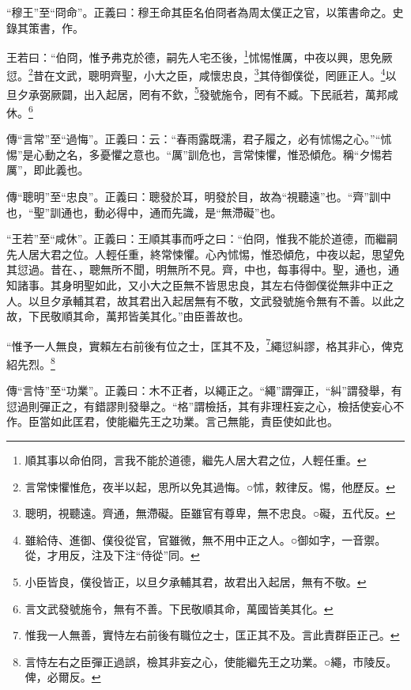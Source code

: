 {\noindent\shu{}\fzkt “穆王”至“冏命”。正義曰：穆王命其臣名伯冏者為周太僕正之官，以策書命之。史錄其策書，作。 \par}

王若曰：“伯冏，惟予弗克於德，嗣先人宅丕後，\footnote{順其事以命伯冏，言我不能於道德，繼先人居大君之位，人輕任重。}怵惕惟厲，中夜以興，思免厥愆。\footnote{言常悚懼惟危，夜半以起，思所以免其過悔。○怵，敕律反。惕，他歷反。}昔在文武，聰明齊聖，小大之臣，咸懷忠良，\footnote{聰明，視聽遠。齊通，無滯礙。臣雖官有尊卑，無不忠良。○礙，五代反。}其侍御僕從，罔匪正人。\footnote{雖給侍、進御、僕役從官，官雖微，無不用中正之人。○御如字，一音禦。從，才用反，注及下注“侍從”同。}以旦夕承弼厥闢，出入起居，罔有不欽，\footnote{小臣皆良，僕役皆正，以旦夕承輔其君，故君出入起居，無有不敬。}發號施令，罔有不臧。下民祇若，萬邦咸休。\footnote{言文武發號施令，無有不善。下民敬順其命，萬國皆美其化。}


{\noindent\zhuan{}\fzbyks 傳“言常”至“過悔”。正義曰：云：“春雨露既濡，君子履之，必有怵惕之心。”“怵惕”是心動之名，多憂懼之意也。“厲”訓危也，言常悚懼，惟恐傾危。稱“夕惕若厲”，即此義也。 \par}

{\noindent\zhuan{}\fzbyks 傳“聰明”至“忠良”。正義曰：聰發於耳，明發於目，故為“視聽遠”也。“齊”訓中也，“聖”訓通也，動必得中，通而先識，是“無滯礙”也。 \par}

{\noindent\shu{}\fzkt “王若”至“咸休”。正義曰：王順其事而呼之曰：“伯冏，惟我不能於道德，而繼嗣先人居大君之位。人輕任重，終常悚懼。心內怵惕，惟恐傾危，中夜以起，思望免其愆過。昔在、，聰無所不聞，明無所不見。齊，中也，每事得中。聖，通也，通知諸事。其身明聖如此，又小大之臣無不皆思忠良，其左右侍御僕從無非中正之人。以旦夕承輔其君，故其君出入起居無有不敬，文武發號施令無有不善。以此之故，下民敬順其命，萬邦皆美其化。”由臣善故也。 \par}

“惟予一人無良，實賴左右前後有位之士，匡其不及，\footnote{惟我一人無善，實恃左右前後有職位之士，匡正其不及。言此責群臣正己。}繩愆糾謬，格其非心，俾克紹先烈。\footnote{言恃左右之臣彈正過誤，檢其非妄之心，使能繼先王之功業。○繩，市陵反。俾，必爾反。}


{\noindent\zhuan{}\fzbyks 傳“言恃”至“功業”。正義曰：木不正者，以繩正之。“繩”謂彈正，“糾”謂發舉，有愆過則彈正之，有錯謬則發舉之。“格”謂檢括，其有非理枉妄之心，檢括使妄心不作。臣當如此匡君，使能繼先王之功業。言己無能，責臣使如此也。 \par}

